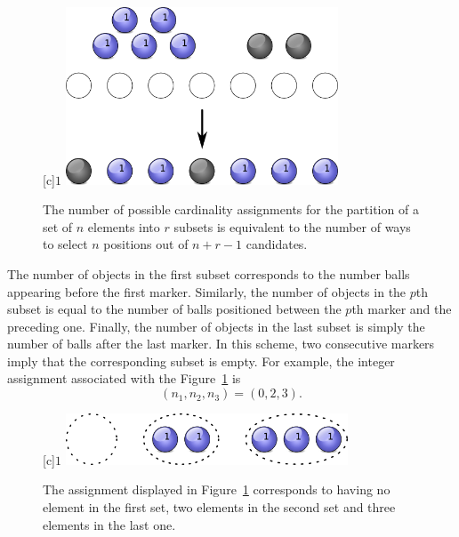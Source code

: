 \begin{figure}[htb!]
\begin{center}
\begin{psfrags}
[c]{$1$}
\includegraphics[height=5.28cm]{Figures/4Chapter/partitioning}
\end{psfrags}
\caption{The number of possible cardinality assignments for the partition of a set of $n$ elements into $r$ subsets is equivalent to the number of ways to select $n$ positions out of $n + r - 1$ candidates.} 
\label{figure:Partitioning}
\end{center}
\end{figure}

The number of objects in the first subset corresponds to the number balls appearing before the first marker.
Similarly, the number of objects in the $p$th subset is equal to the number of balls positioned between the $p$th marker and the preceding one.
Finally, the number of objects in the last subset is simply the number of balls after the last marker.
In this scheme, two consecutive markers imply that the corresponding subset is empty.
For example, the integer assignment associated with the Figure~\ref{figure:Partitioning} is
\begin{equation*}
(n_1, n_2, n_3) = (0,2,3).
\end{equation*}

\begin{figure}[htb!]
\begin{center}
\begin{psfrags}
[c]{$1$}
\includegraphics[height=1.53cm]{Figures/4Chapter/partitioning2}
\end{psfrags}
\caption{The assignment displayed in Figure~\ref{figure:Partitioning} corresponds to having no element in the first set, two elements in the second set and three elements in the last one.}
\label{figure:Partitioning2}
\end{center}
\end{figure}

